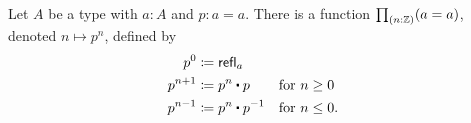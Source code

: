 \documentclass[hott-all.tex]{subfiles}
\begin{document}
% 
% 
\begin{cor}
  Let $A$ be a type with $a:A$ and $p:a=a$.
  There is a function $\prd{n:\Z} (a=a)$, denoted $n\mapsto p^n$, defined by
  \begin{align*}
    p^0 &\defid \refl{a}\\
    p^{n+1} &\defid p^n \ct p
    & &\text{for $n\ge 0$}\\
    p^{n-1} &\defid p^n \ct \opp p
    & &\text{for $n\le 0$.}
  \end{align*}
\end{cor}
% 
% 
% 
\end{document}
